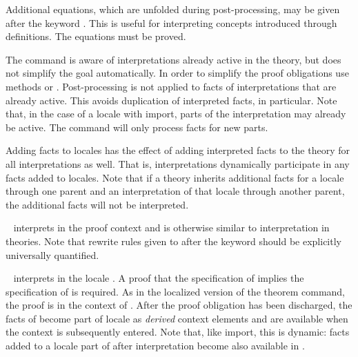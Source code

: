 \begin{isabellebody}
\begin{isamarkuptext}
\begin{description}
  Additional equations, which are unfolded during
  post-processing, may be given after the keyword \hyperlink{keyword.where}{\mbox{}}.
  This is useful for interpreting concepts introduced through
  definitions.  The equations must be proved.

  The command is aware of interpretations already active in the
  theory, but does not simplify the goal automatically.  In order to
  simplify the proof obligations use methods \hyperlink{method.intro-locales}{\mbox{}}
  or \hyperlink{method.unfold-locales}{\mbox{}}.  Post-processing is not applied to
  facts of interpretations that are already active.  This avoids
  duplication of interpreted facts, in particular.  Note that, in the
  case of a locale with import, parts of the interpretation may
  already be active.  The command will only process facts for new
  parts.

  Adding facts to locales has the effect of adding interpreted facts
  to the theory for all interpretations as well.  That is,
  interpretations dynamically participate in any facts added to
  locales.  Note that if a theory inherits additional facts for a
  locale through one parent and an interpretation of that locale
  through another parent, the additional facts will not be
  interpreted.

  \item \hyperlink{command.interpret}{\mbox{}}~ interprets
   in the proof context and is otherwise similar to
  interpretation in theories.  Note that rewrite rules given to
  \hyperlink{command.interpret}{\mbox{}} after the \hyperlink{keyword.where}{\mbox{}} keyword should be
  explicitly universally quantified.

  \item \hyperlink{command.sublocale}{\mbox{}}~
  interprets  in the locale .  A proof that
  the specification of  implies the specification of
   is required.  As in the localized version of the
  theorem command, the proof is in the context of .  After
  the proof obligation has been discharged, the facts of 
  become part of locale  as \emph{derived} context
  elements and are available when the context  is
  subsequently entered.  Note that, like import, this is dynamic:
  facts added to a locale part of  after interpretation
  become also available in .


\end{description}
\end{isamarkuptext}
\end{isabellebody}
